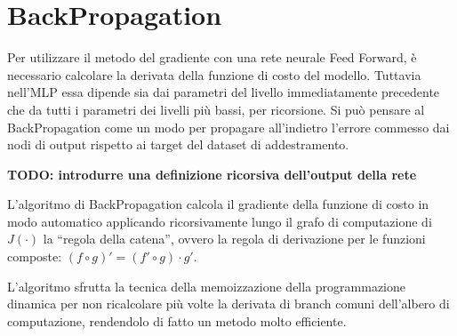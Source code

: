 \documentclass{standalone}
\begin{document}
\section{BackPropagation}
Per utilizzare il metodo del gradiente con una rete neurale Feed Forward, è
necessario calcolare la derivata della funzione di costo del modello. Tuttavia
nell'MLP essa dipende sia dai parametri del livello immediatamente precedente
che da tutti i parametri dei livelli più bassi, per ricorsione. Si può pensare
al BackPropagation come un modo per propagare all'indietro l'errore commesso
dai nodi di output rispetto ai target del dataset di addestramento.

{\large \textbf {TODO: introdurre una definizione ricorsiva dell'output della
    rete}}

L'algoritmo di BackPropagation calcola il gradiente della funzione di costo
in modo automatico applicando ricorsivamente lungo il grafo di computazione di
$J(\cdot)$
la ``regola della catena'', ovvero la regola di derivazione per le funzioni
composte: $ (f \circ g)' = (f' \circ g)\cdot g' $.

L'algoritmo sfrutta la tecnica della memoizzazione della programmazione
dinamica per non ricalcolare più volte la derivata di branch comuni dell'albero
di computazione, rendendolo di fatto un metodo molto efficiente.
\end{document}
